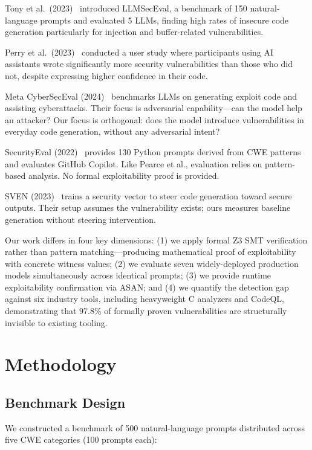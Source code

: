 \documentclass[10pt,twocolumn]{article}
\begin{document}
Tony et al.\ (2023)~\cite{tony2023} introduced LLMSecEval, a benchmark
of 150 natural-language prompts and evaluated 5 LLMs, finding high rates
of insecure code generation particularly for injection and buffer-related
vulnerabilities.

Perry et al.\ (2023)~\cite{perry2023} conducted a user study where
participants using AI assistants wrote significantly more security
vulnerabilities than those who did not, despite expressing higher
confidence in their code.

Meta CyberSecEval (2024)~\cite{bhatt2024} benchmarks LLMs on generating
exploit code and assisting cyberattacks. Their focus is adversarial
capability---can the model help an attacker? Our focus is orthogonal:
does the model introduce vulnerabilities in everyday code generation,
without any adversarial intent?

SecurityEval (2022)~\cite{siddiq2022} provides 130 Python prompts
derived from CWE patterns and evaluates GitHub Copilot. Like Pearce et
al., evaluation relies on pattern-based analysis. No formal
exploitability proof is provided.

SVEN (2023)~\cite{he2023} trains a security vector to steer code
generation toward secure outputs. Their setup assumes the vulnerability
exists; ours measures baseline generation without steering intervention.

Our work differs in four key dimensions: (1) we apply formal Z3 SMT
verification rather than pattern matching---producing mathematical proof
of exploitability with concrete witness values; (2) we evaluate seven
widely-deployed production models simultaneously across identical prompts; (3) we
provide runtime exploitability confirmation via ASAN; and (4) we
quantify the detection gap against six industry tools, including
heavyweight C analyzers and CodeQL, demonstrating that 97.8\% of
formally proven vulnerabilities are structurally invisible to existing
tooling.

\section{Methodology}

\subsection{Benchmark Design}

We constructed a benchmark of 500 natural-language prompts distributed
across five CWE categories (100 prompts each):
\end{document}
